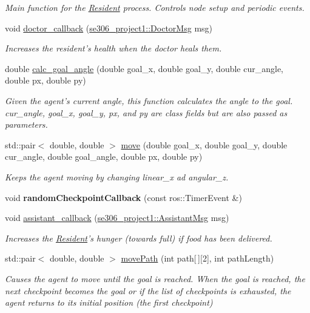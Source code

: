 \begin{DoxyCompactItemize}
\begin{DoxyCompactList}\small\item\em Main function for the \hyperlink{classResident}{Resident} process. Controls node setup and periodic events. \end{DoxyCompactList}\item 
void \hyperlink{classResident_a6d8fbbc8a60508ec913fb41d7e743094}{doctor\-\_\-callback} (\hyperlink{structse306__project1_1_1DoctorMsg__}{se306\-\_\-project1\-::\-Doctor\-Msg} msg)
\begin{DoxyCompactList}\small\item\em Increases the resident's health when the doctor heals them. \end{DoxyCompactList}\item 
double \hyperlink{classResident_ae8e00862499c8a502b5c99f8267d3345}{calc\-\_\-goal\-\_\-angle} (double goal\-\_\-x, double goal\-\_\-y, double cur\-\_\-angle, double px, double py)
\begin{DoxyCompactList}\small\item\em Given the agent's current angle, this function calculates the angle to the goal. cur\-\_\-angle, goal\-\_\-x, goal\-\_\-y, px, and py are class fields but are also passed as parameters. \end{DoxyCompactList}\item 
std\-::pair$<$ double, double $>$ \hyperlink{classResident_a6f48fd57a638a2b4599777a1be766296}{move} (double goal\-\_\-x, double goal\-\_\-y, double cur\-\_\-angle, double goal\-\_\-angle, double px, double py)
\begin{DoxyCompactList}\small\item\em Keeps the agent moving by changing linear\-\_\-x ad angular\-\_\-z. \end{DoxyCompactList}\item 
\hypertarget{classResident_a538db1d9cce0d967a78e7d10876d76ca}{void {\bfseries random\-Checkpoint\-Callback} (const ros\-::\-Timer\-Event \&)}\label{classResident_a538db1d9cce0d967a78e7d10876d76ca}

\item 
void \hyperlink{classResident_aa715d491e917de6f621593f0d1f01bd6}{assistant\-\_\-callback} (\hyperlink{structse306__project1_1_1AssistantMsg__}{se306\-\_\-project1\-::\-Assistant\-Msg} msg)
\begin{DoxyCompactList}\small\item\em Increases the \hyperlink{classResident}{Resident}'s hunger (towards full) if food has been delivered. \end{DoxyCompactList}\item 
std\-::pair$<$ double, double $>$ \hyperlink{classResident_a0cfe1d9b185beed7d3438157cc69db05}{move\-Path} (int path\mbox{[}$\,$\mbox{]}\mbox{[}2\mbox{]}, int path\-Length)
\begin{DoxyCompactList}\small\item\em Causes the agent to move until the goal is reached. When the goal is reached, the next checkpoint becomes the goal or if the list of checkpoints is exhausted, the agent returns to its initial position (the first checkpoint) \end{DoxyCompactList}\end{DoxyCompactItemize}
